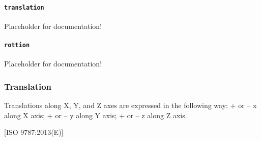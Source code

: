 \paragraph{\texttt{translation}}\mbox{}
\newline\tab Placeholder for documentation!

\paragraph{\texttt{rottion}}\mbox{}
\newline\tab Placeholder for documentation!
\FloatBarrier
\subsubsection{Translation}
  \label{type:Translation}

\FloatBarrier

Translations along X, Y, and Z axes are expressed in the following way: 
  + or – x along X axis;
  + or – y along Y axis;
  + or – z along Z axis.

[ISO 9787:2013(E)]

\FloatBarrier
